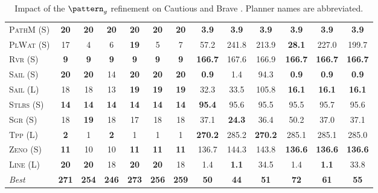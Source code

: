 \documentclass[11pt,landscape]{article}
\begin{document}
\begin{table}[tb]
{\begin{tabular}{|l||cccccc||cccccc||}
\textsc{PathM} (S)&\textbf{20}&\textbf{20}&\textbf{20}&\textbf{20}&\textbf{20}&\textbf{20}&\textbf{3.9}&\textbf{3.9}&\textbf{3.9}&\textbf{3.9}&\textbf{3.9}&\textbf{3.9}\\
\textsc{PlWat} (S)&17&4&6&\textbf{19}&5&7&57.2&241.8&213.9&\textbf{28.1}&227.0&199.7\\
\textsc{Rvr} (S)&\textbf{9}&\textbf{9}&\textbf{9}&\textbf{9}&\textbf{9}&\textbf{9}&\textbf{166.7}&167.6&166.9&\textbf{166.7}&\textbf{166.7}&\textbf{166.7}\\
\textsc{Sail} (S)&\textbf{20}&\textbf{20}&14&\textbf{20}&\textbf{20}&\textbf{20}&\textbf{0.9}&1.4&94.3&\textbf{0.9}&\textbf{0.9}&\textbf{0.9}\\
\textsc{Sail} (L)&18&18&13&\textbf{19}&\textbf{19}&\textbf{19}&32.3&33.5&105.8&\textbf{16.1}&\textbf{16.1}&\textbf{16.1}\\
\textsc{Stlrs} (S)&\textbf{14}&\textbf{14}&\textbf{14}&\textbf{14}&\textbf{14}&\textbf{14}&\textbf{95.4}&95.6&95.5&95.5&95.7&95.6\\
\textsc{Sgr} (S)&18&\textbf{19}&18&17&18&18&37.1&\textbf{24.3}&36.4&50.2&37.0&37.1\\
\textsc{Tpp} (L)&\textbf{2}&1&\textbf{2}&1&1&1&\textbf{270.2}&285.2&\textbf{270.2}&285.1&285.1&285.0\\
\textsc{Zeno} (S)&\textbf{11}&10&10&\textbf{11}&\textbf{11}&\textbf{11}&136.7&144.3&143.8&\textbf{136.6}&\textbf{136.6}&\textbf{136.6}\\
\textsc{Line} (L)&\textbf{20}&\textbf{20}&18&\textbf{20}&\textbf{20}&18&1.4&\textbf{1.1}&34.5&1.4&\textbf{1.1}&33.8
\\\hline
\textit{Best}&\textbf{271}&\textbf{254}&\textbf{246}&\textbf{273}&\textbf{256}&\textbf{259}&\textbf{50}&\textbf{44}&\textbf{51}&\textbf{72}&\textbf{61}&\textbf{55}\\\hline

        \end{tabular}}
        \caption{Impact of the $\pattern_g$ refinement on Cautious and Brave \pattyd. Planner names are abbreviated.}
        \label{tab:abl-patterng}
        \end{table}
        
\end{document}
